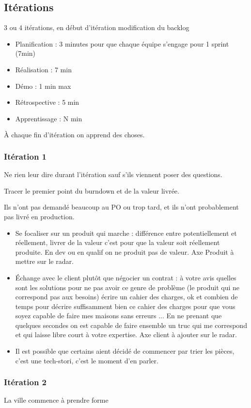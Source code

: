 \documentclass[a4paper,12pt]{article}
\begin{document}
\subsection{Itérations}
3 ou 4 itérations, en début d'itération modification du backlog
\begin{itemize}
  \item Planification : 3 minutes pour que chaque équipe s'engage pour 1 sprint (7min)
  \item Réalisation : 7 min 
  \item Démo : 1 min max
  \item Rétrospective : 5 min 
  \item Apprentissage : N min 
\end{itemize}

À chaque fin d'itération on apprend des choses.
\subsubsection{Itération 1}
Ne rien leur dire durant l'itération sauf s'ils viennent poser des questions.

Tracer le premier point du burndown et de la valeur livrée. 

Ils n'ont pas demandé beaucoup au PO ou trop tard, et ils n'ont probablement pas livré en production. 

\begin{itemize}
  \item Se focaliser sur un produit qui marche : différence entre potentiellement et réellement, livrer de la valeur c'est pour que la valeur soit réellement produite. En dev ou en qualif on ne produit pas de valeur. Axe Produit à mettre sur le radar.
  \item Échange avec le client plutôt que négocier un contrat : à votre avis quelles sont les solutions pour ne pas avoir ce genre de problème (le produit qui ne correspond pas aux besoins) écrire un cahier des charges, ok et combien de temps pour décrire suffisamment bien ce cahier des charges pour que vous soyez capable de faire mes maisons sans erreurs ... En ne prenant que quelques secondes on est capable de faire ensemble un truc qui me correspond et qui laisse libre court à votre expertise. Axe client à ajouter sur le radar.
  \item Il est possible que certains aient décidé de commencer par trier les pièces, c'est une tech-stori, c'est le moment d'en parler.
\end{itemize}

\subsubsection{Itération 2}
La ville commence à prendre forme
\end{document}
